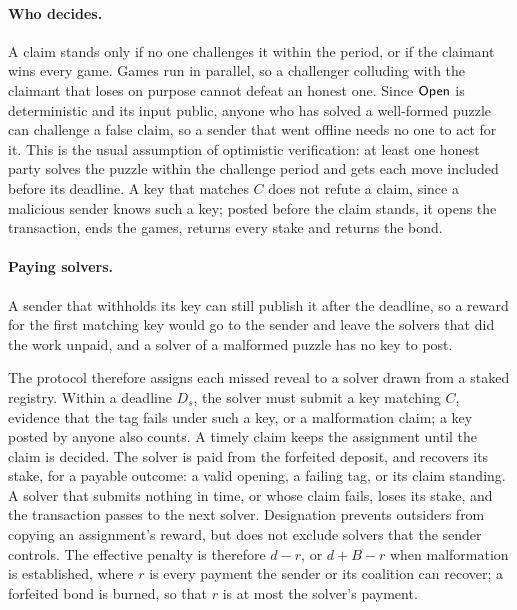 \paragraph{Who decides.}
A claim stands only if no one challenges it within the period, or if the claimant wins every game. Games run in parallel, so a challenger colluding with the claimant that loses on purpose cannot defeat an honest one. Since $\mathsf{Open}$ is deterministic and its input public, anyone who has solved a well-formed puzzle can challenge a false claim, so a sender that went offline needs no one to act for it. This is the usual assumption of optimistic verification: at least one honest party solves the puzzle within the challenge period and gets each move included before its deadline. A key that matches $C$ does not refute a claim, since a malicious sender knows such a key; posted before the claim stands, it opens the transaction, ends the games, returns every stake and returns the bond.

\paragraph{Paying solvers.}
A sender that withholds its key can still publish it after the deadline, so a reward for the first matching key would go to the sender and leave the solvers that did the work unpaid, and a solver of a malformed puzzle has no key to post.

The protocol therefore assigns each missed reveal to a solver drawn from a staked registry. Within a deadline $D_s$, the solver must submit a key matching $C$, evidence that the tag fails under such a key, or a malformation claim; a key posted by anyone also counts. A timely claim keeps the assignment until the claim is decided. The solver is paid from the forfeited deposit, and recovers its stake, for a payable outcome: a valid opening, a failing tag, or its claim standing. A solver that submits nothing in time, or whose claim fails, loses its stake, and the transaction passes to the next solver. Designation prevents outsiders from copying an assignment's reward, but does not exclude solvers that the sender controls. The effective penalty is therefore $d - r$, or $d + B - r$ when malformation is established, where $r$ is every payment the sender or its coalition can recover; a forfeited bond is burned, so that $r$ is at most the solver's payment.

